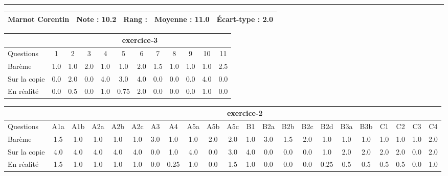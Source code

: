 \documentclass[a4paper, landscape, 10pt]{article}
\begin{document}
  \vspace{0.3cm}
  \hrule
  \vspace{0.3cm}

  \begin{minipage}{\textwidth}
    { \bf
    \begin{tabular}{|c|*{4}{c|}}
    \hline
      Marnot Corentin & Note : 10.2 & Rang :  & Moyenne : 11.0 & \'Ecart-type : 2.0 \\
    \hline
    \end{tabular}
    }
    
      \begin{tabular}{|l|*{ 11 }{c|}}
        \hline
        & \multicolumn{ 11 }{c|}{ exercice-3 } \\
        \hline
        Questions & 1&2&3&4&5&6&7&8&9&10&11 \\
        \hline
        Barème & 1.0&1.0&2.0&1.0&1.0&2.0&1.5&1.0&1.0&1.0&2.5 \\
        \hline
        Sur la copie & 0.0&2.0&0.0&4.0&3.0&4.0&0.0&0.0&0.0&4.0&0.0 \\
        \hline
        En réalité & 0.0&0.5&0.0&1.0&0.75&2.0&0.0&0.0&0.0&1.0&0.0 \\
        \hline
      \end{tabular}
    
      \begin{tabular}{|l|*{ 21 }{c|}}
        \hline
        & \multicolumn{ 21 }{c|}{ exercice-2 } \\
        \hline
        Questions & A1a&A1b&A2a&A2b&A2c&A3&A4&A5a&A5b&A5c&B1&B2a&B2b&B2c&B2d&B3a&B3b&C1&C2&C3&C4 \\
        \hline
        Barème & 1.5&1.0&1.0&1.0&1.0&3.0&1.0&1.0&2.0&2.0&1.0&3.0&1.5&2.0&1.0&1.0&1.0&1.0&1.0&1.0&2.0 \\
        \hline
        Sur la copie & 4.0&4.0&4.0&4.0&4.0&0.0&1.0&4.0&0.0&3.0&4.0&0.0&0.0&0.0&1.0&2.0&2.0&2.0&2.0&0.0&2.0 \\
        \hline
        En réalité & 1.5&1.0&1.0&1.0&1.0&0.0&0.25&1.0&0.0&1.5&1.0&0.0&0.0&0.0&0.25&0.5&0.5&0.5&0.5&0.0&1.0 \\
        \hline
      \end{tabular}
    

\end{minipage}
\end{document}
